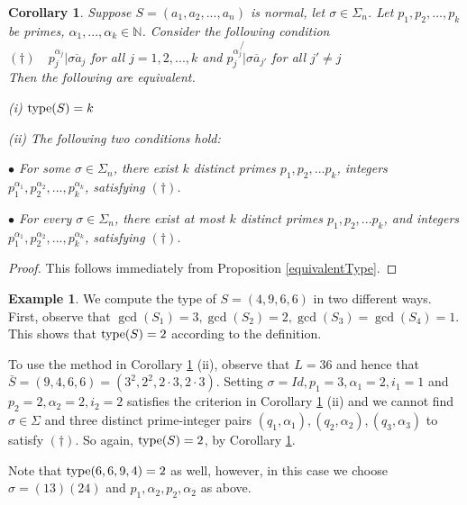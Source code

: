 \documentclass[12pt]{amsart}
\theoremstyle{plain}
\newtheorem{corollary}[subsection]{Corollary}
\theoremstyle{definition}
\newtheorem{example}[subsection]{Example}
\newcommand{\type}{		\operatorname{{\rm type}}}
\newcommand{\Nat}{\ensuremath{\mathbb{N}}}
\begin{document}
\begin{corollary}\label{equivalentType2}
	Suppose $S = (a_1, a_2, ..., a_n)$ is normal, let $\sigma \in \Sigma_n$. Let $p_1, p_2, ..., p_k$ be primes, $\alpha_1, ..., \alpha_k \in \Nat$. Consider the following condition
	\\
	
	$(\dagger) \quad p_j^{\alpha_j} |  \overline{\sigma a_j}$ for all $j = 1,2,...,k$ and $p_j^{\alpha_j} \not{|} \overline{\sigma a_{j'}}$ for all $j' \neq j$
	\\
	 
	Then the following are equivalent. 
	
	(i) $\type(S) = k$
	
	(ii) The following two conditions hold:
	
	$\bullet$ For some $\sigma \in \Sigma_n$, there exist $k$ distinct primes $p_1,p_2,...p_k$, integers $p_1^{\alpha_1}, p_2^{\alpha_2},..., p_k^{\alpha_k}$, satisfying $(\dagger)$. 
	
	$\bullet$ For every $\sigma \in \Sigma_n$, there exist at most $k$ distinct primes $p_1,p_2,...p_k$, and integers $p_1^{\alpha_1}, p_2^{\alpha_2},..., p_k^{\alpha_k}$, satisfying $(\dagger)$.   
\end{corollary}

\begin{proof}
	This follows immediately from Proposition \ref{equivalentType}. 
\end{proof}

\begin{example} We compute the type of $S= (4,9,6,6)$ in two different ways. First, observe that $\gcd(S_1) = 3, \gcd(S_2) = 2, \gcd(S_3) = \gcd(S_4) = 1$. This shows that $\type(S) = 2$ according to the definition. 
	
	To use the method in Corollary \ref{equivalentType2} (ii), observe that $L = 36$ and hence that $\bar{S} = (9,4,6,6) = (3^2, 2^2, 2 \cdot 3, 2 \cdot 3)$. Setting $\sigma = Id, p_1 = 3, \alpha_1 = 2, i_1 = 1$ and $ p_2 = 2, \alpha_2 = 2, i_2 = 2$ satisfies the criterion in Corollary \ref{equivalentType2} (ii) and we cannot find $\sigma \in \Sigma$ and three distinct prime-integer pairs $(q_1, \alpha_1), (q_2, \alpha_2), (q_3,\alpha_3)$ to satisfy $(\dagger)$. So again, $\type(S) = 2$, by Corollary \ref{equivalentType2}.
	
	Note that $\type(6,6,9,4) = 2$ as well, however, in this case we choose $\sigma = (13)(24)$ and $p_1,\alpha_2,p_2,\alpha_2$ as above. 
	
\end{example}  
\end{document}
